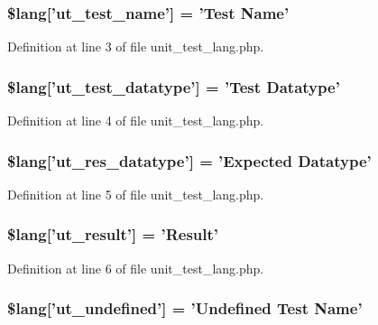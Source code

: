 \subsubsection[{\$lang}]{\setlength{\rightskip}{0pt plus 5cm}\$lang['ut\-\_\-test\-\_\-name'] = '{\bf Test} Name'}\label{unit__test__lang_8php_ad25baa7cab208cbe1fbe6f6913b0e18c}


Definition at line 3 of file unit\-\_\-test\-\_\-lang.\-php.

\subsubsection[{\$lang}]{\setlength{\rightskip}{0pt plus 5cm}\$lang['ut\-\_\-test\-\_\-datatype'] = '{\bf Test} Datatype'}\label{unit__test__lang_8php_a141cfe44ef46b61362f161bc0cf220bc}


Definition at line 4 of file unit\-\_\-test\-\_\-lang.\-php.

\subsubsection[{\$lang}]{\setlength{\rightskip}{0pt plus 5cm}\$lang['ut\-\_\-res\-\_\-datatype'] = 'Expected Datatype'}\label{unit__test__lang_8php_a104083e98991c97a0ffa647a05541146}


Definition at line 5 of file unit\-\_\-test\-\_\-lang.\-php.

\subsubsection[{\$lang}]{\setlength{\rightskip}{0pt plus 5cm}\$lang['ut\-\_\-result'] = 'Result'}\label{unit__test__lang_8php_a01f12785712ee32a97dc53d85e226993}


Definition at line 6 of file unit\-\_\-test\-\_\-lang.\-php.

\subsubsection[{\$lang}]{\setlength{\rightskip}{0pt plus 5cm}\$lang['ut\-\_\-undefined'] = 'Undefined {\bf Test} Name'}\label{unit__test__lang_8php_a08d38874ed86b9368f126d7597801077}


